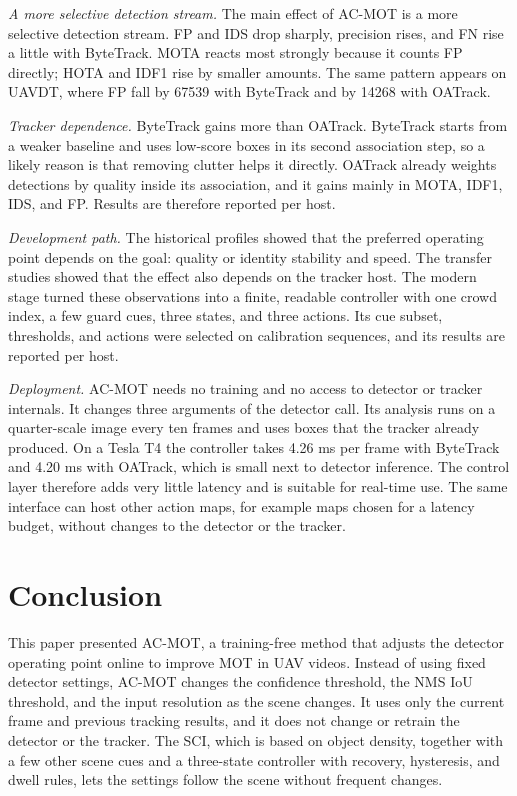 \documentclass[journal]{new-aiaa}
\begin{document}
\emph{A more selective detection stream.} The main effect of AC-MOT is a more
selective detection stream. FP and IDS drop sharply, precision rises, and FN
rise a little with ByteTrack. MOTA reacts most strongly because it counts FP
directly; HOTA and IDF1 rise by smaller amounts. The same pattern appears on
UAVDT, where FP fall by 67539 with ByteTrack and by 14268 with OATrack.

\emph{Tracker dependence.} ByteTrack gains more than OATrack. ByteTrack starts
from a weaker baseline and uses low-score boxes in its second association
step, so a likely reason is that removing clutter helps it directly. OATrack
already weights detections by quality inside its association, and it gains
mainly in MOTA, IDF1, IDS, and FP. Results are therefore reported per host.

\emph{Development path.} The historical profiles showed that the preferred
operating point depends on the goal: quality or identity stability and speed.
The transfer studies showed that the effect also depends on the tracker host.
The modern stage turned these observations into a finite, readable controller
with one crowd index, a few guard cues, three states, and three actions. Its
cue subset, thresholds, and actions were selected on calibration sequences,
and its results are reported per host.

\emph{Deployment.} AC-MOT needs no training and no access to detector or
tracker internals. It changes three arguments of the detector call. Its
analysis runs on a quarter-scale image every ten frames and uses boxes that
the tracker already produced. On a Tesla T4 the controller takes 4.26 ms per
frame with ByteTrack and 4.20 ms with OATrack, which is small next to detector
inference. The control layer therefore adds very little latency and is
suitable for real-time use. The same interface can host other action maps, for
example maps chosen for a latency budget, without changes to the detector or
the tracker.
\section{Conclusion}\label{sec:conclusion}

This paper presented AC-MOT, a training-free method that adjusts the detector
operating point online to improve MOT in UAV videos. Instead of using fixed
detector settings, AC-MOT changes the confidence threshold, the NMS IoU
threshold, and the input resolution as the scene changes. It uses only the
current frame and previous tracking results, and it does not change or retrain
the detector or the tracker. The SCI, which is based on object density,
together with a few other scene cues and a three-state controller with
recovery, hysteresis, and dwell rules, lets the settings follow the scene
without frequent changes.
\end{document}
